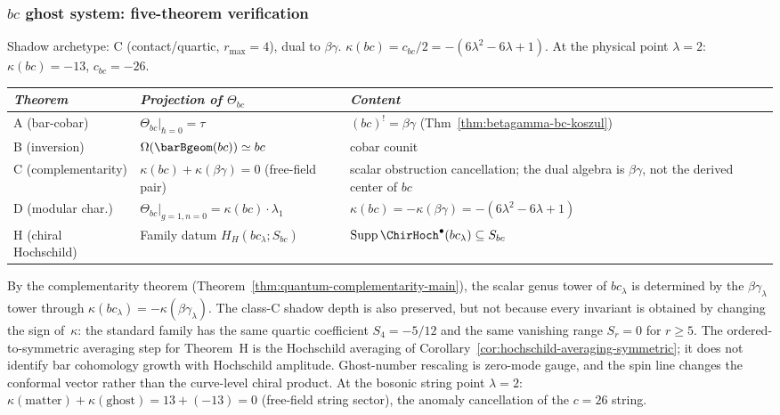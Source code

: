 \subsubsection{$bc$ ghost system: five-theorem verification}

\begin{computation}
\label{comp:bc-five-theorems}
Shadow archetype: C (contact/quartic, $r_{\max} = 4$),
dual to $\beta\gamma$.
$\kappa(bc) = c_{bc}/2 = -(6\lambda^2 - 6\lambda + 1)$.
At the physical point $\lambda = 2$: $\kappa(bc) = -13$, $c_{bc} = -26$.
\begin{center}
\small
\renewcommand{\arraystretch}{1.3}
\begin{tabular}{lll}
\toprule
\emph{Theorem} & \emph{Projection of $\Theta_{bc}$}
 & \emph{Content} \\
\midrule
A (bar-cobar) &
 $\Theta_{bc}\big|_{\hbar=0} = \tau$ &
 $(bc)^! = \beta\gamma$ (Thm~\ref{thm:betagamma-bc-koszul}) \\
B (inversion) &
 $\Omega(\barBgeom(bc)) \simeq bc$ &
 cobar counit \\
C (complementarity) &
 $\kappa(bc) + \kappa(\beta\gamma) = 0$ \textup{(}free-field pair\textup{)} &
 scalar obstruction cancellation; the dual algebra is
 $\beta\gamma$, not the derived center of $bc$ \\
D (modular char.) &
 $\Theta_{bc}\big|_{g=1,n=0}
 = \kappa(bc) \cdot \lambda_1$ &
 $\kappa(bc) = -\kappa(\beta\gamma) = -(6\lambda^2{-}6\lambda{+}1)$ \\
H (chiral Hochschild) &
 Family datum $H_H(bc_\lambda;S_{bc})$ &
 $\operatorname{Supp}\ChirHoch^\bullet(bc_\lambda)\subseteq S_{bc}$ \\
\bottomrule
\end{tabular}
\end{center}
By the complementarity theorem
(Theorem~\ref{thm:quantum-complementarity-main}),
the scalar genus tower of $bc_\lambda$ is determined by the
$\beta\gamma_\lambda$ tower through
$\kappa(bc_\lambda)=-\kappa(\beta\gamma_\lambda)$. The class-C
shadow depth is also preserved, but not because every invariant is
obtained by changing the sign of~$\kappa$: the standard family has
the same quartic coefficient $S_4=-5/12$ and the same vanishing
range $S_r=0$ for $r\geq 5$.
The ordered-to-symmetric averaging step for Theorem~H is the
Hochschild averaging of
Corollary~\ref{cor:hochschild-averaging-symmetric}; it does not
identify bar cohomology growth with Hochschild amplitude.
Ghost-number rescaling is zero-mode gauge, and the spin line changes
the conformal vector rather than the curve-level chiral product.
At the bosonic string point $\lambda = 2$:
$\kappa(\mathrm{matter}) + \kappa(\mathrm{ghost}) = 13 + (-13) = 0$ \textup{(}free-field string sector\textup{)},
the anomaly cancellation of the $c = 26$ string.
\end{computation}

